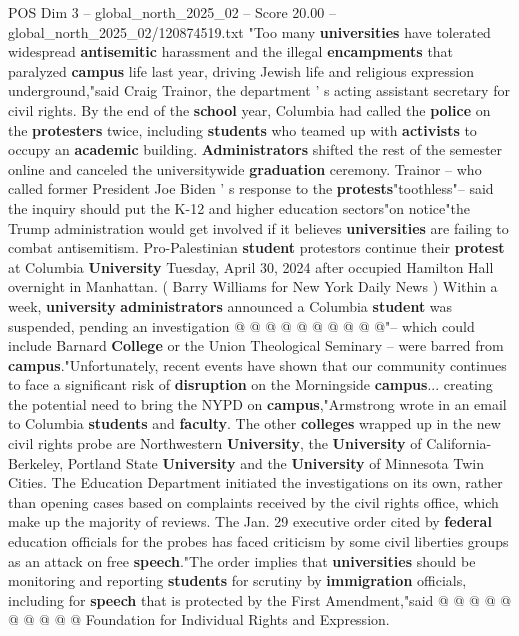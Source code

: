 \begin{textsample}{POS Dim 3 – global\_north\_2025\_02 – Score 20.00 – global\_north\_2025\_02/120874519.txt}  \label{ex:f3_pos_281}
"Too many \textbf{universities} have tolerated widespread \textbf{antisemitic} harassment and the illegal \textbf{encampments} that paralyzed \textbf{campus} life last year, driving Jewish life and religious expression underground,"said Craig Trainor, the department ' s acting assistant secretary for civil rights.
By the end of the \textbf{school} year, Columbia had called the \textbf{police} on the \textbf{protesters} twice, including \textbf{students} who teamed up with \textbf{activists} to occupy an \textbf{academic} building. \textbf{Administrators} shifted the rest of the semester online and canceled the universitywide \textbf{graduation} ceremony.
Trainor -- who called former President Joe Biden ' s response to the \textbf{protests}"toothless"-- said the inquiry should put the K-12 and higher education sectors"on notice"the Trump administration would get involved if it believes \textbf{universities} are failing to combat antisemitism.
Pro-Palestinian \textbf{student} protestors continue their \textbf{protest} at Columbia \textbf{University} Tuesday, April 30, 2024 after occupied Hamilton Hall overnight in Manhattan. ( Barry Williams for New York Daily News ) Within a week, \textbf{university} \textbf{administrators} announced a Columbia \textbf{student} was suspended, pending an investigation @ @ @ @ @ @ @ @ @ @"-- which could include Barnard \textbf{College} or the Union Theological Seminary -- were barred from \textbf{campus}."Unfortunately, recent events have shown that our community continues to face a significant risk of \textbf{disruption} on the Morningside \textbf{campus}... creating the potential need to bring the NYPD on \textbf{campus},"Armstrong wrote in an email to Columbia \textbf{students} and \textbf{faculty}.
The other \textbf{colleges} wrapped up in the new civil rights probe are Northwestern \textbf{University}, the \textbf{University} of California-Berkeley, Portland State \textbf{University} and the \textbf{University} of Minnesota Twin Cities.
The Education Department initiated the investigations on its own, rather than opening cases based on complaints received by the civil rights office, which make up the majority of reviews.
The Jan. 29 executive order cited by \textbf{federal} education officials for the probes has faced criticism by some civil liberties groups as an attack on free \textbf{speech}."The order implies that \textbf{universities} should be monitoring and reporting \textbf{students} for scrutiny by \textbf{immigration} officials, including for \textbf{speech} that is protected by the First Amendment,"said @ @ @ @ @ @ @ @ @ @ Foundation for Individual Rights and Expression.

\end{textsample}
